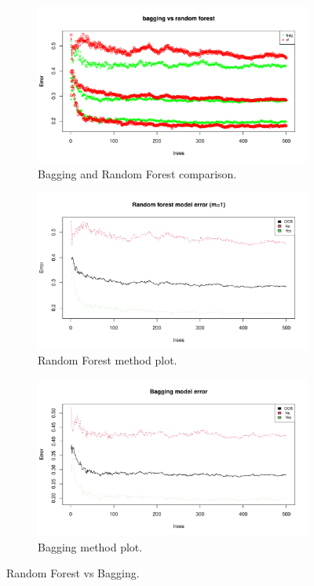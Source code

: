 \begin{figure}[H]
	\centering
	\begin{subfigure}{.3\textwidth}
		\centering
		\includegraphics[width=\linewidth]{ImageFiles/Classification/Trees/vs_bagg_for_500_plot}
		\caption{Bagging and Random Forest comparison.}
		\label{fig:vs_bagg_for_500_plot}
	\end{subfigure}%
	\hfill
	\begin{subfigure}{.3\textwidth}
		\centering
		\includegraphics[width=\linewidth]{ImageFiles/Classification/Trees/best_for_500_plot}
		\caption{Random Forest method plot.}
		\label{fig:best_for_500_plot}
	\end{subfigure}%
	\hfill
	\begin{subfigure}{.3\textwidth}
		\centering
		\includegraphics[width=\linewidth]{ImageFiles/Classification/Trees/bagg_500_plot}
		\caption{Bagging method plot.}
		\label{fig:bagg_500_plot}
	\end{subfigure}
	\caption{Random Forest vs Bagging.}
	\label{fig:RFvsB}
\end{figure}

